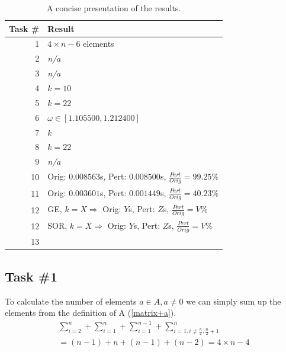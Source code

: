 \documentclass[10pt, a4paper]{article}
\begin{document}
\begin{table}[h]
\begin{center}
\begin{tabular}{r | l}
Task \# & Result \\ \hline
1		& $4\times n-6$ elements                                                     \\
2		& \emph{n/a}                                                                 \\
3		& \emph{n/a}                                                                 \\
4		& $k=10$                                                                     \\
5		& $k=22$	                                                             \\
6		& $\omega\in[1.105500, 1.212400]$                                            \\
7		& $k$                                                                      \\ %
8		& $k=22$                                                                     \\
9		& \emph{n/a}                                                                 \\
10		& Orig: $0.008563$s, Pert: $0.008500$s, $\frac{Pert}{Orig}=99.25\%$ 	     \\
11		& Orig: $0.003601$s, Pert: $0.001449$s, $\frac{Pert}{Orig}=40.23\%$ 	     \\
12		& GE, $k=X \Rightarrow$ Orig: $Y$s, Pert: $Z$s, $\frac{Pert}{Orig}=V\%$      \\ %
12		& SOR, $k=X \Rightarrow$ Orig: $Y$s, Pert: $Z$s, $\frac{Pert}{Orig}=V\%$     \\ %
13		& %
\end{tabular}
\caption{A concise presentation of the results.}
\end{center}
\label{table+result}
\end{table}

\subsection{Task \#1}
To calculate the number of elements $a\in A, a\neq0$ we can simply sum up the elements from the definition of A (\ref{matrix+a}).
\begin{eqnarray}
		\sum_{i=2}^n + \sum_{i=1}^n+\sum_{i=1}^{n-1}+\sum_{i=1,i\neq \frac{n}{2},\frac{n}{2}+1}^n \\
		= (n-1)+n+(n-1)+(n-2)=4\times n -4
\end{eqnarray}
\end{document}
